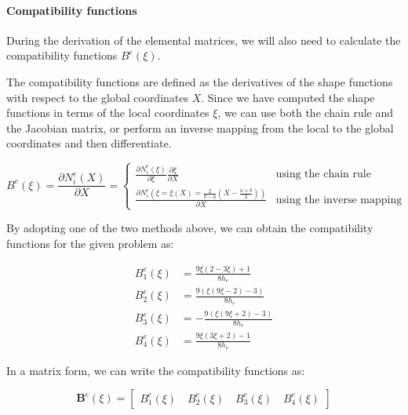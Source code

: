 \paragraph{Compatibility functions}

During the derivation of the elemental matrices, we will also need to calculate the compatibility functions $B^e(\xi)$.

The compatibility functions are defined as the derivatives of the shape functions with respect to the global coordinates $X$.
Since we have computed the shape functions in terms of the local coordinates $\xi$, we can use both the chain rule and the Jacobian matrix, or perform an inverse mapping from the local to the global coordinates and then differentiate.

\begin{equation}
    B^e(\xi) = \frac{\partial N_i^e(X)}{\partial X} =
    \begin{cases}
        \frac{\partial N_i^e(\xi)}{\partial \xi} \frac{\partial \xi}{\partial X}            & \text{using the chain rule}      \\
        \frac{\partial N_i^e(\xi = \xi(X) = \frac{2}{b-a} (X - \frac{a+b}{2}))}{\partial X} & \text{using the inverse mapping}
    \end{cases}
\end{equation}

By adopting one of the two methods above, we can obtain the compatibility functions for the given problem as:

\begin{align}
    B_1^e(\xi) & = \frac{9 \xi (2-3 \xi )+1}{8 h_e}    \\
    B_2^e(\xi) & = \frac{9 (\xi (9 \xi -2)-3)}{8 h_e}  \\
    B_3^e(\xi) & = -\frac{9 (\xi (9 \xi +2)-3)}{8 h_e} \\
    B_4^e(\xi) & = \frac{9 \xi (3 \xi +2)-1}{8 h_e}
\end{align}

In a matrix form, we can write the compatibility functions as:

\begin{equation}
    \mathbf{B}^e(\xi) = \begin{bmatrix}
        B_1^e(\xi) \quad B_2^e(\xi) \quad B_3^e(\xi) \quad B_4^e(\xi)
    \end{bmatrix}
\end{equation}
